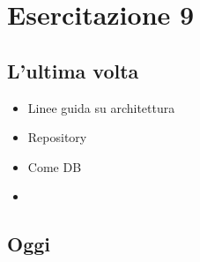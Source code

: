 
\chapter{Esercitazione 9}
\section{L'ultima volta}
\begin{itemize}
    \item Linee guida su architettura
    \item Repository
    \item Come DB
    \item  
\end{itemize}

\section{Oggi}
